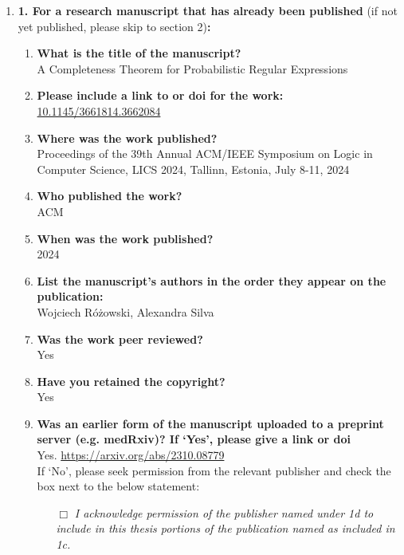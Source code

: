 	
	\begin{enumerate}\itemsep0em
%		
		\item \textbf{1.	For a research manuscript that has already been published} (if not yet published, please skip to section 2)\textbf{:}
%
		\begin{enumerate}\itemsep0em
%			
			\item \textbf{What is the title of the manuscript?}\\
			A Completeness Theorem for Probabilistic Regular Expressions
			\item \textbf{Please include a link to or doi for the work:}\\
			\url{10.1145/3661814.3662084}
			\item \textbf{Where was the work published?}\\
            Proceedings of the 39th Annual {ACM/IEEE} Symposium on Logic in Computer
                  Science, {LICS} 2024, Tallinn, Estonia, July 8-11, 2024
			\item \textbf{Who published the work?}\\
			ACM
			\item \textbf{When was the work published?}\\
			2024
			\item \textbf{List the manuscript's authors in the order they appear on the publication:}\\
			Wojciech R\'{o}\.{z}owski, Alexandra Silva
			\item \textbf{Was the work peer reviewed?}\\
			Yes
			\item \textbf{Have you retained the copyright?}\\
			Yes 
			\item \textbf{Was an earlier form of the manuscript uploaded to a preprint server (e.g. medRxiv)? If ‘Yes’, please give a link or doi} \\
	    	Yes. \url{https://arxiv.org/abs/2310.08779}
			\\
			If ‘No’, please seek permission from the relevant publisher and check the box next to the below statement:
%			
			\begin{itemize}\itemsep0em
				\item[$\Box$] {\itshape I acknowledge permission of the publisher named under 1d to include in this thesis portions of the publication named as included in 1c.}

\end{itemize}
\end{enumerate}
\end{enumerate}
